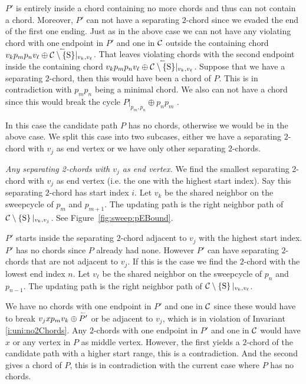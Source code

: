       $P'$ is entirely inside a chord containing no more chords and thus can not contain a chord. Moreover, $P'$ can not have a separating $2$-chord since we evaded the end of the first one ending.
      Just as in the above case we can not have any violating chord with one endpoint in $P'$ and one in $\mathcal{C}$ outside the containing chord $v_k p_m p_n v_\ell \oplus \accentset{\leftharpoonup}{\mathcal{C}\setminus \left\lbrace {\mathrm{S}} \right\rbrace} |_{v_k, v_\ell}$.
      That leaves violating chords with the second endpoint inside the containing chord $v_k p_m p_n v_\ell \oplus \accentset{\leftharpoonup}{\mathcal{C}\setminus \left\lbrace {\mathrm{S}} \right\rbrace} |_{v_k, v_\ell}$.
      Suppose that we have a separating $2$-chord, then this would have been a chord of $P$. This is in contradiction with $p_m p_n$ being a minimal chord.
      We also can not have a chord since this would break the cycle $P|_{p_m, p_n} \oplus p_n p_m$ .

    In this case the candidate path $P$ has no chords, otherwise we would be in the above case. We split this case into two subcases, either we have a separating $2$-chord with $v_j$ as end vertex or we have only other separating $2$-chords.

    \emph{Any separating 2-chords with $v_j$ as end vertex.}
      We find the smallest separating 2-chord with $v_j$ as end vertex (i.e. the one with the highest start index). Say this separating $2$-chord has start index $i$.
      Let $v_k$ be the shared neighbor on the sweepcycle of $p_{m}$ and $p_{m +1}$. The updating path is the right neighbor path of $\mathcal{C} \setminus \left\lbrace {\mathrm{S}} \right\rbrace|_{v_k, v_j}$. See Figure~\ref{fig:sweep:pEBound}.

      $P'$ starts inside the separating $2$-chord adjacent to $v_j$ with the highest start index. $P'$ has no chords since $P$ already had none.
      However $P'$ can have separating $2$-chords that are not adjacent to $v_j$.
      If this is the case we find the $2$-chord with the lowest end index $n$.
      Let $v_\ell$ be the shared neighbor on the sweepcycle of $p_{n}$ and $p_{n-1}$.
      The updating path is the right neighbor path of $\mathcal{C} \setminus \left\lbrace {\mathrm{S}} \right\rbrace|_{v_k, v_\ell}$.

      We have no chords with one endpoint in $P'$ and one in $\mathcal{C}$ since these would have to break $v_j x p_m v_k \oplus \accentset{\leftharpoonup}{P'}$ or be adjacent to $v_j$, which is in violation of Invariant \ref{i:uni:no2Chords}.
      Any $2$-chords with one endpoint in $P'$ and one in $\mathcal{C}$ would have $x$ or any vertex in $P$ as middle vertex.
      However, the first yields a $2$-chord of the candidate path with a higher start range, this is a contradiction.
      And the second gives a chord of $P$, this is in contradiction with the current case where $P$ has no chords.

